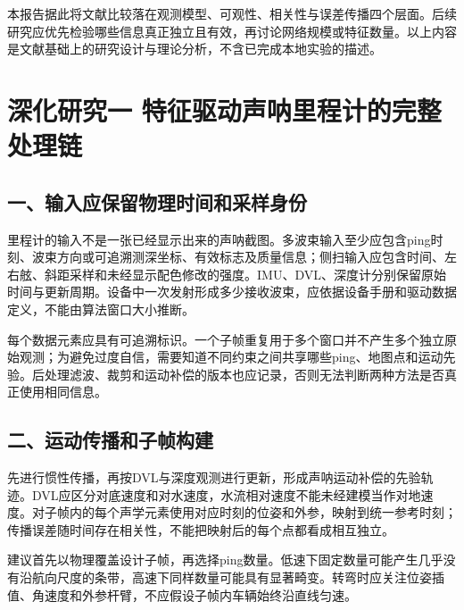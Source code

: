 本报告据此将文献比较落在观测模型、可观性、相关性与误差传播四个层面。后续研究应优先检验哪些信息真正独立且有效，再讨论网络规模或特征数量。以上内容是文献基础上的研究设计与理论分析，不含已完成本地实验的描述。

\hypertarget{ux6df1ux5316ux7814ux7a76ux4e00-ux7279ux5f81ux9a71ux52a8ux58f0ux5450ux91ccux7a0bux8ba1ux7684ux5b8cux6574ux5904ux7406ux94fe}{%
\section{深化研究一 特征驱动声呐里程计的完整处理链}\label{ux6df1ux5316ux7814ux7a76ux4e00-ux7279ux5f81ux9a71ux52a8ux58f0ux5450ux91ccux7a0bux8ba1ux7684ux5b8cux6574ux5904ux7406ux94fe}}

\hypertarget{ux4e00ux8f93ux5165ux5e94ux4fddux7559ux7269ux7406ux65f6ux95f4ux548cux91c7ux6837ux8eabux4efd}{%
\subsection{一、输入应保留物理时间和采样身份}\label{ux4e00ux8f93ux5165ux5e94ux4fddux7559ux7269ux7406ux65f6ux95f4ux548cux91c7ux6837ux8eabux4efd}}

里程计的输入不是一张已经显示出来的声呐截图。多波束输入至少应包含ping时刻、波束方向或可追溯测深坐标、有效标志及质量信息；侧扫输入应包含时间、左右舷、斜距采样和未经显示配色修改的强度。IMU、DVL、深度计分别保留原始时间与更新周期。设备中一次发射形成多少接收波束，应依据设备手册和驱动数据定义，不能由算法窗口大小推断。

每个数据元素应具有可追溯标识。一个子帧重复用于多个窗口并不产生多个独立原始观测；为避免过度自信，需要知道不同约束之间共享哪些ping、地图点和运动先验。后处理滤波、裁剪和运动补偿的版本也应记录，否则无法判断两种方法是否真正使用相同信息。

\hypertarget{ux4e8cux8fd0ux52a8ux4f20ux64adux548cux5b50ux5e27ux6784ux5efa}{%
\subsection{二、运动传播和子帧构建}\label{ux4e8cux8fd0ux52a8ux4f20ux64adux548cux5b50ux5e27ux6784ux5efa}}

先进行惯性传播，再按DVL与深度观测进行更新，形成声呐运动补偿的先验轨迹。DVL应区分对底速度和对水速度，水流相对速度不能未经建模当作对地速度。对子帧内的每个声学元素使用对应时刻的位姿和外参，映射到统一参考时刻；传播误差随时间存在相关性，不能把映射后的每个点都看成相互独立。

建议首先以物理覆盖设计子帧，再选择ping数量。低速下固定数量可能产生几乎没有沿航向尺度的条带，高速下同样数量可能具有显著畸变。转弯时应关注位姿插值、角速度和外参杆臂，不应假设子帧内车辆始终沿直线匀速。

